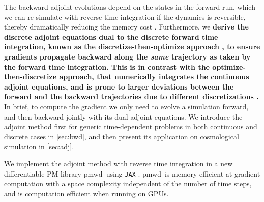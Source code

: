 \documentclass[modern, dvipsnames]{aastex631}
\newcommand{\pmwd}{{\usefont{T1}{nova}{m}{sl}pmwd}}
\newcommand{\HL}[1]{\textcolor{Bittersweet}{\textbf{#1}}}
\begin{document}
The backward adjoint evolutions depend on the states in the forward run,
which we can re-simulate with reverse time integration if the dynamics
is reversible, thereby dramatically reducing the memory cost
\citep{NeuralODE}.
Furthermore, we \HL{derive the discrete adjoint equations dual to the
discrete forward time integration, known as the discretize-then-optimize
approach \citep[e.g.,][]{ANODE}, to ensure gradients propagate backward
along the \emph{same} trajectory as taken by the forward time
integration.
This is in contrast with the optimize-then-discretize approach, that
numerically integrates the continuous adjoint equations, and is prone to
larger deviations between the forward and the backward trajectories due
to different discretizations \citep{LanzieriLanusseEtAl2022}.}
In brief, to compute the gradient we only need to evolve a simulation
forward, and then backward jointly with its dual adjoint equations.
We introduce the adjoint method first for generic time-dependent
problems in both continuous and discrete cases in \autoref{sec:bwd}, and
then present its application on cosmological simulation in
\autoref{sec:adj}.

We implement the adjoint method with reverse time integration in a new
differentiable PM library \pmwd\ using \texttt{JAX} \citep{pmwd}.
\pmwd\ is memory efficient at gradient computation with a space
complexity independent of the number of time steps, and is computation
efficient when running on GPUs.
\end{document}
